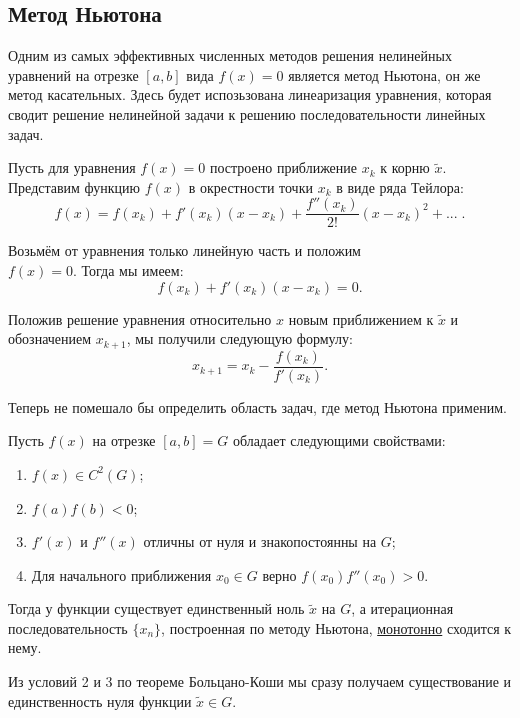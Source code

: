 \documentclass[../main.tex]{subfile}
\begin{document}
\subsection{Метод Ньютона}

Одним из самых эффективных численных методов решения нелинейных уравнений на
отрезке $[a,b]$ вида $f(x)=0$ является метод Ньютона, он же метод касательных.
Здесь будет испозьзована линеаризация уравнения, которая сводит решение
нелинейной задачи к решению последовательности линейных задач.

\begin{algorithm}
	Пусть для уравнения $f(x)=0$ построено приближение $x_k$ к корню
	$\widetilde{x}$. Представим функцию $f(x)$ в окрестности точки $x_k$ в
	виде ряда Тейлора:
	\[f(x)=f(x_k)+f'(x_k)(x-x_k)+\frac{f''(x_k)}{2!}(x-x_k)^2+...\;.\]

	Возьмём от уравнения только линейную часть и положим \\
	$f(x)=0$. Тогда мы имеем:
	\[f(x_k)+f'(x_k)(x-x_k)=0.\]

	Положив решение уравнения относительно $x$ новым приближением к
	$\widetilde{x}$ и обозначением $x_{k+1}$, мы получили следующую формулу:
	\[\boxed{x_{k+1}=x_k-\frac{f(x_k)}{f'(x_k)}.}\]
\end{algorithm}

Теперь не помешало бы определить область задач, где метод Ньютона применим.
\newline

\begin{theorem}
	Пусть $f(x)$ на отрезке $[a,b]=G$ обладает следующими свойствами:
	\begin{enumerate}
		\item $f(x)\in C^2(G)$;
		\item $f(a)f(b)<0$;
		\item $f'(x)$ и $f''(x)$ отличны от нуля и знакопостоянны на $G$;
		\item Для начального приближения $x_0\in G$ верно $f(x_0)f''(x_0)>0$.
	\end{enumerate}

	Тогда у функции существует единственный ноль $\widetilde{x}$ на $G$, а
	итерационная последовательность $\{x_n\}$, построенная по методу Ньютона,
	\underline{монотонно} сходится к нему.
\end{theorem}

\beginproof

	Из условий 2 и 3 по теореме Больцано-Коши мы сразу получаем существование
	и единственность нуля функции $\widetilde{x}\in G$.
\end{document}
